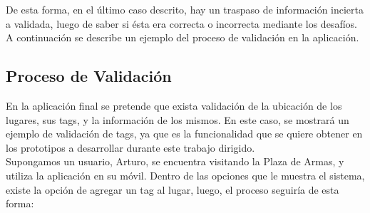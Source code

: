 \documentclass[10pt,letterpaper]{article}
\begin{document}
De esta forma, en el último caso descrito, hay un traspaso de información incierta a validada, luego de saber si ésta era correcta o incorrecta mediante los desafíos.\\

A continuación se describe un ejemplo del proceso de validación en la aplicación.

\subsection{Proceso de Validación}

En la aplicación final se pretende que exista validación de la ubicación de los lugares, sus tags, y la información de los mismos. En este caso, se mostrará un ejemplo de validación de tags, ya que es la funcionalidad que se quiere obtener en los prototipos a desarrollar durante este trabajo dirigido.\\

Supongamos un usuario, Arturo, se encuentra visitando la Plaza de Armas, y utiliza la aplicación en su móvil. Dentro de las opciones que le muestra el sistema, existe la opción de agregar un tag al lugar, luego, el proceso seguiría de esta forma:\\
\end{document}
